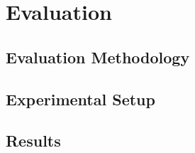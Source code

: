 
%

\chapter{Evaluation}
\label{cha:evaluation}

\section{Evaluation Methodology}
\label{sec:eval-methodology}



\section{Experimental Setup}
\label{sec:eval-setup}



\section{Results}
\label{sec:eval-results}



